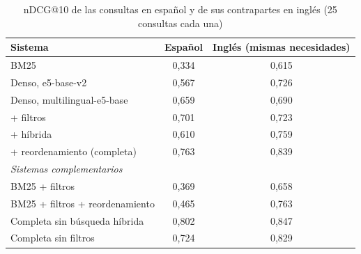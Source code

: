 \begin{table}[htbp!]
    \centering
    \caption{nDCG@10 de las consultas en español y de sus contrapartes en inglés (25 consultas cada una)}
    \label{tab:res-pe1-idioma}
    \begin{tabular}{|l|c|c|}
        \hline
        \textbf{Sistema} & \textbf{Español} & \textbf{Inglés (mismas necesidades)} \\
        \hline
        BM25 & 0{,}334 & 0{,}615 \\
        \hline
        Denso, e5-base-v2 & 0{,}567 & 0{,}726 \\
        \hline
        Denso, multilingual-e5-base & 0{,}659 & 0{,}690 \\
        \hline
        + filtros & 0{,}701 & 0{,}723 \\
        \hline
        + híbrida & 0{,}610 & 0{,}759 \\
        \hline
        + reordenamiento (completa) & 0{,}763 & 0{,}839 \\
        \hline
        \multicolumn{3}{|l|}{\textit{Sistemas complementarios}} \\
        \hline
        BM25 + filtros & 0{,}369 & 0{,}658 \\
        \hline
        BM25 + filtros + reordenamiento & 0{,}465 & 0{,}763 \\
        \hline
        Completa sin búsqueda híbrida & 0{,}802 & 0{,}847 \\
        \hline
        Completa sin filtros & 0{,}724 & 0{,}829 \\
        \hline
    \end{tabular}
\end{table}
